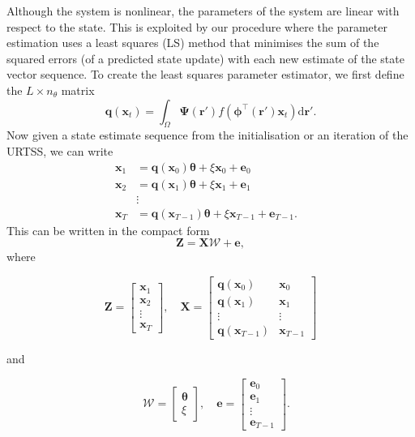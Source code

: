 \documentclass[10pt]{article}
\begin{document}
Although the system is nonlinear, the parameters of the system are linear with respect to the state. This is exploited by our procedure where the parameter estimation uses a least squares (LS) method that minimises the sum of the squared errors (of a predicted state update) with each new estimate of the state vector sequence. To create the least squares parameter estimator, we first define the $L \times n_{\theta}$ matrix
\begin{equation}
	\mathbf{q}(\mathbf{x}_t) = \int_\Omega \boldsymbol{\Psi}(\mathbf{r}') f(\boldsymbol{\phi}^{\top}(\mathbf{r}')\mathbf{x}_t) \textrm{d}\mathbf{r}'.
\end{equation}
Now given a state estimate sequence from the initialisation or an iteration of the URTSS, we can write
\begin{align*}
	\mathbf x_{1} &= \mathbf{q}(\mathbf x_0) \boldsymbol{\theta}+\xi\mathbf x_0+\mathbf e_0 \\
	\mathbf x_{2} &= \mathbf{q}(\mathbf x_1) \boldsymbol{\theta}+\xi\mathbf x_1+\mathbf e_1  \\
	&\vdots& \\
	\mathbf x_{T}&=\mathbf{q}(\mathbf x_{T-1}) \boldsymbol{\theta}+\xi\mathbf x_{T-1}+\mathbf e_{T-1}. 
\end{align*}
This can be written in the compact form
\begin{equation}
	\mathbf Z=\mathbf X \mathcal W+\mathbf{e}, 
\end{equation}
where
\begin{small}
\begin{equation*}
	\mathbf Z=\left[
	\begin{array}{cccc}
		\mathbf x_{1}\\
		\mathbf x_{2}\\
		\vdots\\
		\mathbf x_{T}
	\end{array}
	\right],\quad \mathbf X=\left[
	\begin{array}{cccc}
		\mathbf q(\mathbf x_0)& \mathbf x_{0}\\
		\mathbf q(\mathbf x_1)& \mathbf x_{1}\\
		\vdots & \vdots\\
		\mathbf q(\mathbf x_{T-1})& \mathbf x_{T-1}
	\end{array}
	\right] 
\end{equation*}
\end{small}
and
\begin{small}
\begin{equation*}
\quad \mathcal W=\left[
	\begin{array}{cc}
		\boldsymbol{\theta} \\
		\xi
	\end{array}
	\right],\quad \mathbf{e}=\left[
	\begin{array}{cccc}
		\mathbf e_0\\
		\mathbf e_1\\
		\vdots\\
		\mathbf e_{T-1}
	\end{array}
	\right].
\end{equation*}
\end{small}
\end{document}
